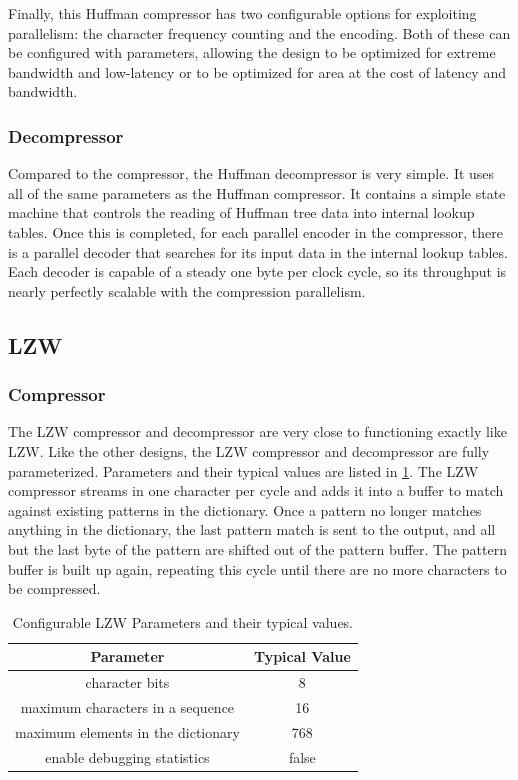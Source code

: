 \documentclass[doublespace,nopageskip]{VTthesis}
\begin{document}
Finally, this Huffman compressor has two configurable options for exploiting parallelism: the character frequency counting and the encoding. Both of these can be configured with parameters, allowing the design to be optimized for extreme bandwidth and low-latency or to be optimized for area at the cost of latency and bandwidth.

\subsubsection{Decompressor}\label{sss:decompressor}
Compared to the compressor, the Huffman decompressor is very simple. It uses all of the same parameters as the Huffman compressor. It contains a simple state machine that controls the reading of Huffman tree data into internal lookup tables. Once this is completed, for each parallel encoder in the compressor, there is a parallel decoder that searches for its input data in the internal lookup tables. Each decoder is capable of a steady one byte per clock cycle, so its throughput is nearly perfectly scalable with the compression parallelism.

\subsection{LZW}\label{ss:lzw}
\subsubsection{Compressor}\label{sss:compressor}
The LZW compressor and decompressor are very close to functioning exactly like LZW. Like the other designs, the LZW compressor and decompressor are fully parameterized. Parameters and their typical values are listed in \ref{tab:lzw-configuration-table}. The LZW compressor streams in one character per cycle and adds it into a buffer to match against existing patterns in the dictionary. Once a pattern no longer matches anything in the dictionary, the last pattern match is sent to the output, and all but the last byte of the pattern are shifted out of the pattern buffer. The pattern buffer is built up again, repeating this cycle until there are no more characters to be compressed.

\begin{table}[htb]
	\centering
	\caption{Configurable LZW Parameters and their typical values.}
	\begin{tabular}{|c|c|}
	    \hline
	    Parameter & Typical Value \\
	    \hline
	    character bits & 8 \\
	    \hline
	    maximum characters in a sequence & 16 \\
	    \hline
	    maximum elements in the dictionary & 768 \\ 
	    \hline
	    enable debugging statistics & false \\
	    \hline
	\end{tabular}
	\label{tab:lzw-configuration-table}
\end{table}
\end{document}
